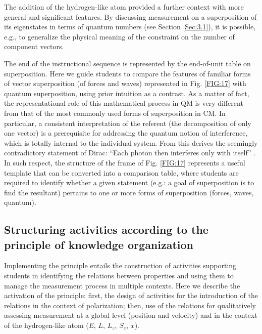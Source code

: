 \documentclass[twocolumn,secnumarabic,amssymb, nobibnotes, aps, prd, nofootinbib]{revtex4-2}
\begin{document}
The addition of the hydrogen-like atom provided a further context with more general and significant features. By discussing measurement on a superposition of its eigenstates in terms of quantum numbers (see Section \ref{Sec:3.1}), it is possible, e.g., to generalize the physical meaning of the constraint on the number of component vectors.

The end of the instructional sequence is represented by the end-of-unit table on superposition. Here we guide students to compare the features of familiar forms of vector superposition (of forces and waves) represented in Fig. \ref{FIG:17} with quantum superposition, using prior intuition as a contrast. As a matter of fact, the representational role of this mathematical process in QM is very different from that of the most commonly used forms of superposition in CM. In particular, a consistent interpretation of the referent (the decomposition of only one vector) is a prerequisite for addressing the quantum notion of interference, which is totally internal to the individual system. From this derives the seemingly contradictory statement of Dirac: ``Each photon then interferes only with itself'' \cite[p. 9]{Dirac1967}. In such respect, the structure of the frame of Fig. \ref{FIG:17} represents a useful template that can be converted into a comparison table, where students are required to identify whether a given statement (e.g.: a goal of superposition is to find the resultant) pertains to one or more forms of superposition (forces, waves, quantum).


\subsection{Structuring activities according to the principle of knowledge organization} \label{Sec:3.3}
Implementing the principle entails the construction of activities supporting students in identifying the relations between properties and using them to manage the measurement process in multiple contexts. Here we describe the activation of the principle: first, the design of activities for the introduction of the relations in the context of polarization; then, use of the relations for qualitatively assessing measurement at a global level (position and velocity) and in the context of the hydrogen-like atom ($E$, $L$, $L_z$, $S_z$, $x$).
\end{document}

